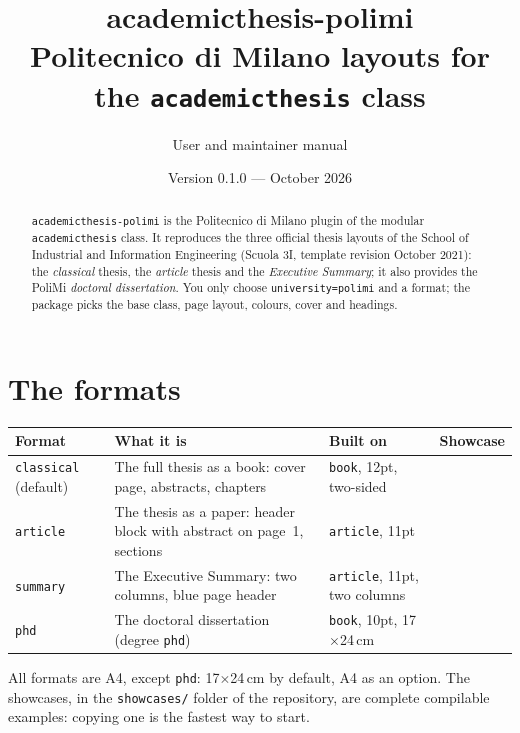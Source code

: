 \documentclass[11pt,a4paper]{article}
\title{\color{bluepoli}\textbf{academicthesis-polimi}\\[4pt]
  \large Politecnico di Milano layouts for the \texttt{academicthesis} class}
\author{User and maintainer manual}
\date{Version 0.1.0 --- October 2026}
\newcommand{\opt}[1]{\texttt{#1}}                    %
\begin{document}
\maketitle

\begin{abstract}
\noindent \opt{academicthesis-polimi} is the Politecnico di Milano plugin of
the modular \opt{academicthesis} class. It reproduces the three official
thesis layouts of the School of Industrial and Information Engineering
(Scuola 3I, template revision October 2021): the \emph{classical} thesis,
the \emph{article} thesis and the \emph{Executive Summary}; it also
provides the PoliMi \emph{doctoral dissertation}. You only choose
\opt{university=polimi} and a format; the package picks the base class, page
layout, colours, cover and headings.
\end{abstract}

\tableofcontents

\section{The formats}

\begin{tabularx}{\textwidth}{@{}l Y l Y@{}}
\toprule
\textbf{Format} & \textbf{What it is} & \textbf{Built on} & \textbf{Showcase} \\
\midrule
\opt{classical} (default) & The full thesis as a book: cover page, abstracts, chapters
  & \opt{book}, 12pt, two-sided &  \\
\opt{article} & The thesis as a paper: header block with abstract on page~1, sections
  & \opt{article}, 11pt &  \\
\opt{summary} & The Executive Summary: two columns, blue page header
  & \opt{article}, 11pt, two columns &  \\
\opt{phd} & The doctoral dissertation (degree \opt{phd})
  & \opt{book}, 10pt, 17$\times$24\,cm &  \\
\bottomrule
\end{tabularx}

All formats are A4, except \opt{phd}: 17$\times$24\,cm by default, A4 as an option. The showcases, in the \opt{showcases/} folder of the
repository, are complete compilable examples: copying one is the fastest way
to start.
\end{document}
